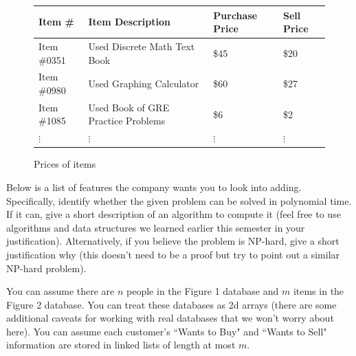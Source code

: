 \documentclass[12pt]{elsart}
\begin{document}
\begin{figure}[h]
  \caption{Prices of items }
\begin{tabular}{ |p{3cm}|p{6cm}|p{2.15cm}|p{2.15cm}| }
  \hline
   Item \# &  Item Description &  Purchase Price &  Sell Price \\
  \hline  \hline
   Item \#0351 &  Used Discrete Math Text Book &  \$45 & \$20  \\
  \hline
   Item \#0980 &  Used Graphing Calculator &  \$60 & \$27  \\
  \hline
   Item \#1085 &  Used Book of GRE Practice Problems &  \$6 & \$2  \\
  \hline
   $\vdots$ & $\vdots$& $\vdots$  &  $\vdots$ \\
  \hline
\end{tabular}
\end{figure}

Below is a list of features the company wants you to look into adding.  Specifically, identify whether the given problem can be solved in polynomial time.  If it can, give a short description of an algorithm to compute it (feel free to use algorithms and data structures we learned earlier this semester in your justification).  Alternatively, if you believe the problem is NP-hard, give a short justification why (this doesn't need to be a proof but try to point out a similar NP-hard problem).

You can assume there are $n$ people in the Figure 1 database and $m$ items in the Figure 2 database.  You can treat these databases as 2d arrays (there are some additional caveats for working with real databases that we won't worry about here). You can assume each customer's ``Wants to Buy" and ``Wants to Sell" information are stored in linked lists of length at most $m$.
\end{document}
